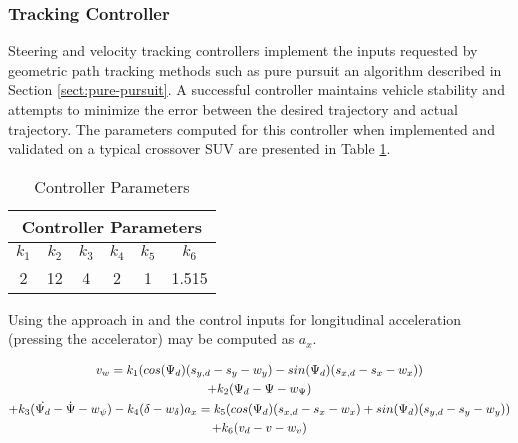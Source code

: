 \subsubsection{Tracking Controller}
\label{sect:tracking}
Steering and velocity tracking controllers implement the inputs requested by geometric path tracking methods such as pure pursuit an algorithm described in Section \ref{sect:pure-pursuit}. A successful controller maintains vehicle stability and attempts to minimize the error between the desired trajectory and actual trajectory. The parameters computed for this controller when implemented and validated on a typical crossover SUV \cite{Althoff2014} are presented in Table \ref{table:controller}. 

\begin{table}[h]
	\centering
	\caption{Controller Parameters \cite{Althoff2014}}
	\label{table:controller}
	\begin{tabular}{|c|c|c|c|c|c|}
		\hline
		\multicolumn{6}{|c|}{Controller Parameters} \\ \hline
		$k_1$ & $k_2$ & $k_3$ & $k_4$ & $k_5$ & $k_6$ \\ \hline
		2 & 12 & 4 & 2 & 1 & 1.515 \\ \hline
	\end{tabular}	
\end{table}

Using the approach in \cite{Snider2009} and \cite{Althoff2014} the control inputs for longitudinal acceleration (pressing the accelerator) may be computed as $a_x$. 



\begin{gather}
v_w=k_1(cos{(\Psi_d)}(s_{y,d}-s_y-w_y)-sin{(\Psi_d)}(s_{x,d}-s_x-w_x)) \notag \\ +k_2(\Psi_d-\Psi-w_{\Psi}) \notag \\ +k_3(\dot{\Psi_d}-\dot{\Psi}-w_{\psi})-k_4(\delta-w_{\delta})
a_x=k_5(cos{(\Psi_d)}(s_{x,d}-s_x-w_x)+sin{(\Psi_d)}(s_{y,d}-s_y-w_y)) \notag \\ +k_6(v_d-v-w_v)
\end{gather}

